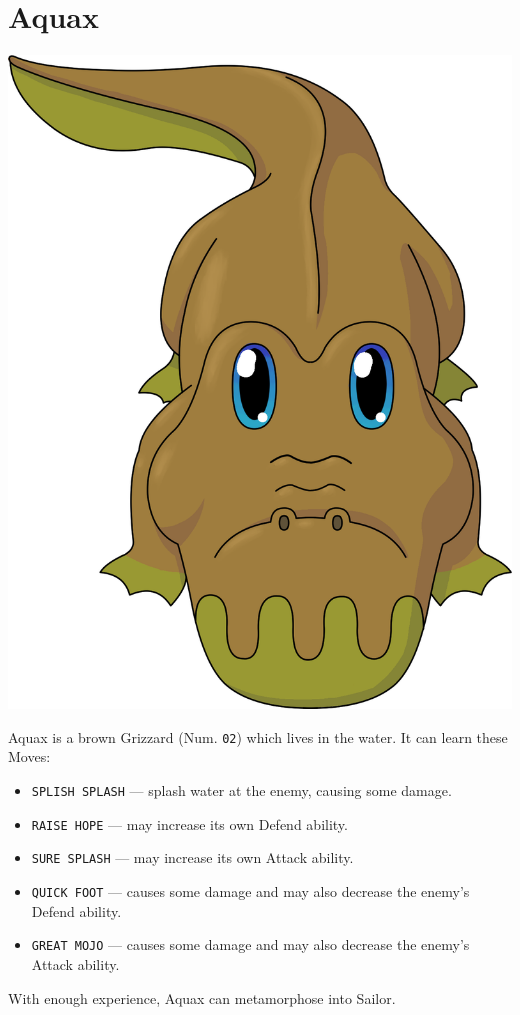 \documentclass[9pt,twocolumn,openany,article]{memoir}
\newenvironment{ritemize}{\begin{itemize}\raggedright}{\end{itemize}}
\begin{document}
\fi

\pagebreak

\section{Aquax}

\begin{center}
  \includegraphics[width=.7\columnwidth]{../Manual/Aquax.png}
\end{center}


\noindent{}Aquax is a  brown Grizzard (Num. \texttt{02})  which lives in
the water. It can learn these Moves:

\begin{ritemize}
\item  \texttt{SPLISH SPLASH}  --- splash  water at  the enemy,  causing
  some damage. 
\item \texttt{RAISE HOPE} --- may increase its own Defend ability.
\item \texttt{SURE SPLASH} --- may increase its own Attack ability.
\item \texttt{QUICK FOOT}  --- causes some damage and  may also decrease
  the enemy's Defend ability.
\item \texttt{GREAT MOJO}  --- causes some damage and  may also decrease
  the enemy's Attack ability.
\end{ritemize}

With enough experience, Aquax can metamorphose into Sailor.
\end{document}

